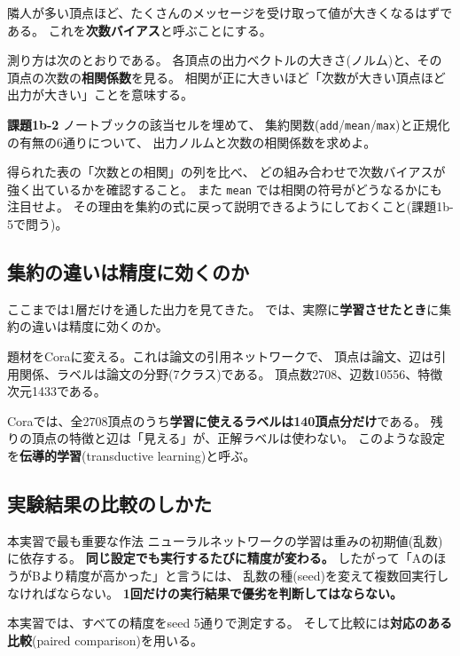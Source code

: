 \documentclass[11pt,a4paper]{jsarticle}
\begin{document}
隣人が多い頂点ほど、たくさんのメッセージを受け取って値が大きくなるはずである。
これを\textbf{次数バイアス}と呼ぶことにする。

測り方は次のとおりである。
各頂点の出力ベクトルの大きさ(ノルム)と、その頂点の次数の\textbf{相関係数}を見る。
相関が正に大きいほど「次数が大きい頂点ほど出力が大きい」ことを意味する。

\begin{screen}
\textbf{課題1b-2} \quad ノートブックの該当セルを埋めて、
集約関数(\verb|add|/\verb|mean|/\verb|max|)と正規化の有無の6通りについて、
出力ノルムと次数の相関係数を求めよ。
\end{screen}

\noindent
得られた表の「次数との相関」の列を比べ、
どの組み合わせで次数バイアスが強く出ているかを確認すること。
また \verb|mean| では相関の符号がどうなるかにも注目せよ。
その理由を集約の式に戻って説明できるようにしておくこと(課題1b-5で問う)。

\subsection{集約の違いは精度に効くのか}

ここまでは1層だけを通した出力を見てきた。
では、実際に\textbf{学習させたとき}に集約の違いは精度に効くのか。

題材をCoraに変える。これは論文の引用ネットワークで、
頂点は論文、辺は引用関係、ラベルは論文の分野(7クラス)である。
頂点数2708、辺数10556、特徴次元1433である。

Coraでは、全2708頂点のうち\textbf{学習に使えるラベルは140頂点分だけ}である。
残りの頂点の特徴と辺は「見える」が、正解ラベルは使わない。
このような設定を\textbf{伝導的学習}(transductive learning)と呼ぶ。

\subsection{実験結果の比較のしかた}\label{sec:paired}

\begin{itembox}[l]{本実習で最も重要な作法}
ニューラルネットワークの学習は重みの初期値(乱数)に依存する。
\textbf{同じ設定でも実行するたびに精度が変わる。}
したがって「AのほうがBより精度が高かった」と言うには、
乱数の種(seed)を変えて複数回実行しなければならない。
\textbf{1回だけの実行結果で優劣を判断してはならない。}
\end{itembox}

\noindent
本実習では、すべての精度をseed 5通りで測定する。
そして比較には\textbf{対応のある比較}(paired comparison)を用いる。
\end{document}

